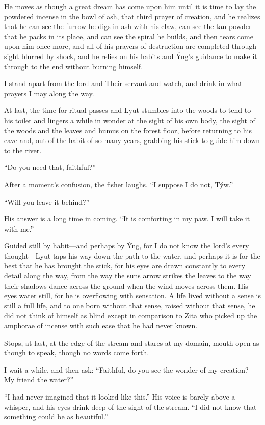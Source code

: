 He moves as though a great dream has come upon him until it is time to lay the powdered incense in the bowl of ash, that third prayer of creation, and he realizes that he can see the furrow he digs in ash with his claw, can see the tan powder that he packs in its place, and can see the spiral he builds, and then tears come upon him once more, and all of his prayers of destruction are completed through sight blurred by shock, and he relies on his habits and Ýng's guidance to make it through to the end without burning himself.

I stand apart from the lord and Their servant and watch, and drink in what prayers I may along the way.

At last, the time for ritual passes and Lyut stumbles into the woods to tend to his toilet and lingers a while in wonder at the sight of his own body, the sight of the woods and the leaves and humus on the forest floor, before returning to his cave and, out of the habit of so many years, grabbing his stick to guide him down to the river.

``Do you need that, faithful?''

After a moment's confusion, the fisher laughs. ``I suppose I do not, Týw.''

``Will you leave it behind?''

His answer is a long time in coming. ``It is comforting in my paw. I will take it with me.''

Guided still by habit---and perhaps by Ýng, for I do not know the lord's every thought---Lyut taps his way down the path to the water, and perhaps it is for the best that he has brought the stick, for his eyes are drawn constantly to every detail along the way, from the way the suns arrow strikes the leaves to the way their shadows dance across the ground when the wind moves across them. His eyes water still, for he is overflowing with sensation. A life lived without a sense is still a full life, and to one born without that sense, raised without that sense, he did not think of himself as blind except in comparison to Zita who picked up the amphorae of incense with such ease that he had never known.

Stops, at last, at the edge of the stream and stares at my domain, mouth open as though to speak, though no words come forth.

I wait a while, and then ask: ``Faithful, do you see the wonder of my creation? My friend the water?''

``I had never imagined that it looked like this.'' His voice is barely above a whisper, and his eyes drink deep of the sight of the stream. ``I did not know that something could be as beautiful.''

